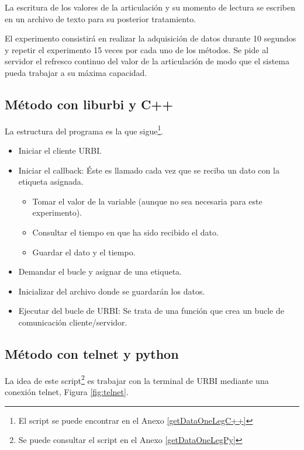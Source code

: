 \documentclass[12pt,a4paper,final,twoside]{book}
\begin{document}
La escritura de los valores de la articulación y su momento de lectura se escriben en un archivo de texto para su posterior tratamiento.

El experimento consistirá en realizar la adquisición de datos durante 10 segundos y repetir el experimento 15 veces por cada uno de los métodos. Se pide al servidor el refresco continuo del valor de la articulación de modo que el sistema pueda trabajar a su máxima capacidad. 

\subsection{Método con liburbi y C++}

La estructura del programa es la que sigue\footnote{El script se puede encontrar en el Anexo \ref{getDataOneLegC++}}. 

\begin{itemize}
\item Iniciar el cliente URBI.
\item Iniciar el callback: Éste es llamado cada vez que se reciba un dato con la etiqueta asignada. 
\begin{itemize}
\item Tomar el valor de la variable (aunque no sea necesaria para este experimento).
\item Consultar el tiempo en que ha sido recibido el dato.
\item Guardar el dato y el tiempo.
\end{itemize}
\item Demandar el bucle y asignar de una etiqueta.
\item Inicializar del archivo donde se guardarán los datos.
\item Ejecutar del bucle de URBI: Se trata de una función que crea un bucle de comunicación cliente/servidor. 
\end{itemize}

\subsection{Método con telnet y python}
La idea de este script\footnote{Se puede consultar el script en el Anexo \ref{getDataOneLegPy}} es trabajar con la terminal de URBI  mediante una conexión telnet, Figura \ref{fig:telnet}.
\end{document}
